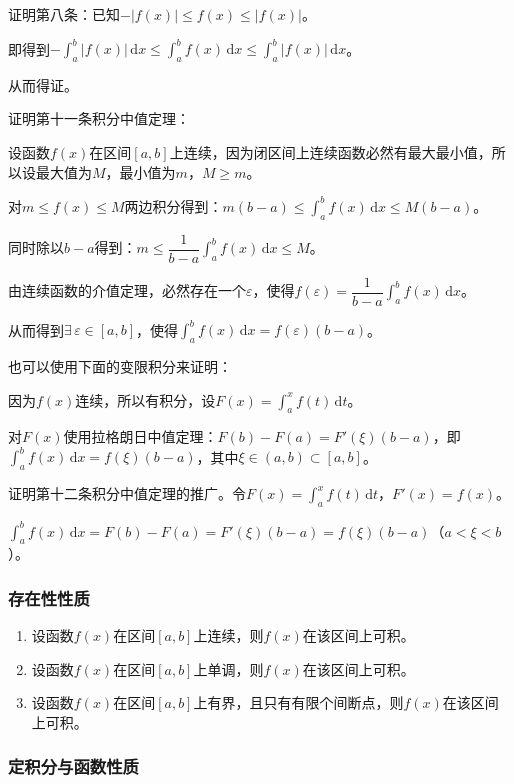 \documentclass[UTF8, 12pt]{ctexart}
\begin{document}
证明第八条：已知$-\vert f(x)\vert\leqslant f(x)\leqslant\vert f(x)\vert$。

即得到$-\int_a^b\vert f(x)\vert\,\textrm{d}x\leqslant\int_a^bf(x)\,\textrm{d}x\leqslant\int_a^b\vert f(x)\vert\,\textrm{d}x$。

从而得证。

证明第十一条积分中值定理：

设函数$f(x)$在区间$[a,b]$上连续，因为闭区间上连续函数必然有最大最小值，所以设最大值为$M$，最小值为$m$，$M\geqslant m$。

对$m\leqslant f(x)\leqslant M$两边积分得到：$m(b-a)\leqslant\int_a^bf(x)\,\textrm{d}x\leqslant M(b-a)$。

同时除以$b-a$得到：$m\leqslant\dfrac{1}{b-a}\int_a^bf(x)\,\textrm{d}x\leqslant M$。

由连续函数的介值定理，必然存在一个$\varepsilon$，使得$f(\varepsilon)=\dfrac{1}{b-a}\int_a^bf(x)\,\textrm{d}x$。

从而得到$\exists\,\varepsilon\in[a,b]$，使得$\int_a^bf(x)\,\textrm{d}x=f(\varepsilon)(b-a)$。

也可以使用下面的变限积分来证明：

因为$f(x)$连续，所以有积分，设$F(x)=\int_a^xf(t)\,\textrm{d}t$。

对$F(x)$使用拉格朗日中值定理：$F(b)-F(a)=F'(\xi)(b-a)$，即$\int_a^bf(x)\,\textrm{d}x=f(\xi)(b-a)$，其中$\xi\in(a,b)\subset[a,b]$。

证明第十二条积分中值定理的推广。令$F(x)=\int_a^xf(t)\,\textrm{d}t$，$F'(x)=f(x)$。

$\int_a^bf(x)\,\textrm{d}x=F(b)-F(a)=F'(\xi)(b-a)=f(\xi)(b-a)$（$a<\xi<b$）。

\subsubsection{存在性性质}

\begin{enumerate}
    \item 设函数$f(x)$在区间$[a,b]$上连续，则$f(x)$在该区间上可积。
    \item 设函数$f(x)$在区间$[a,b]$上单调，则$f(x)$在该区间上可积。
    \item 设函数$f(x)$在区间$[a,b]$上有界，且只有有限个间断点，则$f(x)$在该区间上可积。
\end{enumerate}

\subsubsection{定积分与函数性质}
\end{document}
